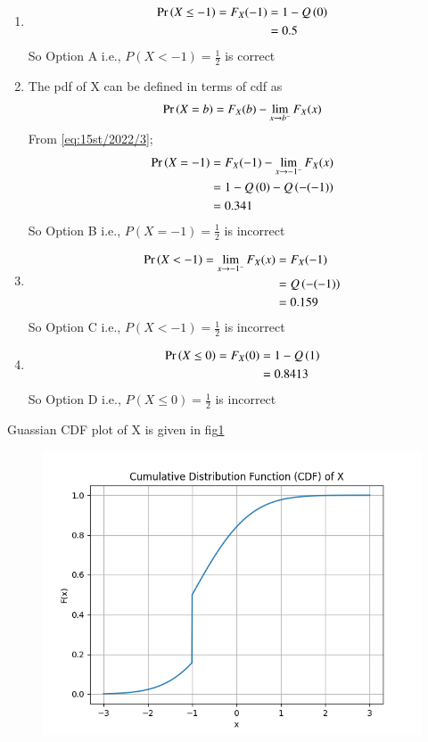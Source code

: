 \documentclass[article]{IEEEtran}
\theoremstyle{remark}
\begin{document}
\begin{enumerate}
\item \begin{align}
	\Pr\left(X \le -1\right) = F_X(-1) &= 1 - Q\left(0\right) \\
	&= 0.5
\end{align}
So Option A i.e., $P(X < -1) = \frac{1}{2}$ is correct
\item The pdf of X can be defined in terms of cdf as 
\begin{align}
	\Pr\left(X = b\right) = F_X(b) - \lim_{x \to b^-}F_X(x) \label{eq:15st/2022/3}
\end{align}
From \eqref{eq:15st/2022/3};
\begin{align}
	\Pr\left(X = -1\right) &= F_X(-1) - \lim_{x \to -1^-}F_X(x)\\
	&= 1-Q\left(0\right) - Q\left(-(-1)\right)\\
	&= 0.341
\end{align} 
So Option B i.e., $P(X = -1) = \frac{1}{2}$ is incorrect
\item  \begin{align}
	\Pr\left(X < -1\right) = \lim_{x \to -1^-}F_X(x)&= F_X(-1) \\
	&= Q\left(-(-1)\right)\\
	&= 0.159
\end{align}
So Option C i.e., $P(X < -1) = \frac{1}{2}$ is incorrect
\item \begin{align}
	\Pr\left(X \leq 0\right) = F_X(0)	&= 1 - Q\left(1\right) \\
	&= 0.8413
\end{align}
So Option D i.e., $P(X \leq 0) = \frac{1}{2}$ is incorrect
\end{enumerate}
\newpage
Guassian CDF plot of X is given in fig\ref{fig:15st/2022} \\
\begin{figure}[ht!]
    \centering
    \includegraphics[width=\columnwidth]{2023/ST/15/figs/figure.png}
    \caption{}
    \label{fig:15st/2022}
\end{figure}
\end{document}
